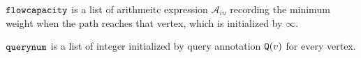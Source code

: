  $\mathtt{flowcapacity}$ is a list of arithmeitc expression $\mathcal{A}_{in}$ 
 recording the minimum weight when the path reaches that vertex, which is initialized by $\infty$.
 
 $\mathtt{querynum}$ is a list of integer
 initialized by query annotation $\mathtt{Q}(v)$ for every vertex. 
 
 
